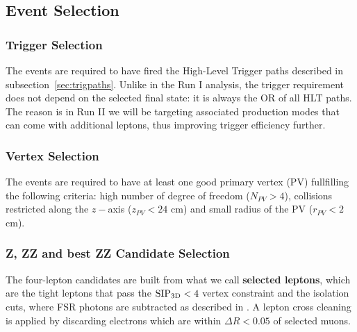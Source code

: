 \subsection{Event Selection}
\label{sec:eventsel}


\subsubsection{Trigger Selection}
\label{sec:HLTsel}

The events are required to have fired the High-Level Trigger paths described in subsection~\ref{sec:trigpaths}. Unlike in the Run I analysis, the trigger requirement does not depend on the selected final state: it is always the OR of all HLT paths. The reason is in Run II we will be targeting associated production modes that can come with additional leptons, thus improving trigger efficiency further.


\subsubsection{Vertex Selection}
\label{sec:vertexsel}

The events are required to have at least one good primary
vertex (PV) fullfilling the following criteria: high number of degree
of freedom ($N_{PV}>4$), collisions restricted along the $z-$axis
($z_{PV}<24$ cm) and small radius of the PV ($r_{PV}<2$ cm).


\subsubsection{Z, ZZ and best ZZ Candidate Selection}
\label{sec:zzcandsel}

The four-lepton candidates are built from what we call {\bf selected leptons}, which  
are the tight leptons that pass the ${\rm SIP_{3D}} < 4$ vertex constraint and the isolation cuts, 
where FSR photons are subtracted as described in \cite{CMS-PAS-HIG-19-001}.
A lepton cross cleaning is applied 
by discarding electrons which are within $\Delta R < 0.05$ of selected muons. 


